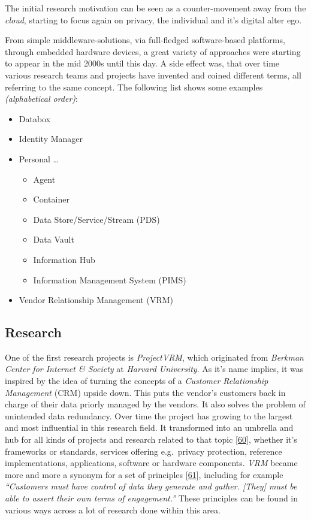 \documentclass[12pt,english,a4paper,titlepage,cleardoublepage=empty,dottedtoc]{report}
\providecommand{\tightlist}{%
  \setlength{\itemsep}{0pt}\setlength{\parskip}{0pt}}
\begin{document}
The initial research motivation can be seen as a counter-movement away
from the \emph{cloud}, starting to focus again on privacy, the
individual and it's digital alter ego.

From simple middleware-solutions, via full-fledged software-based
platforms, through embedded hardware devices, a great variety of
approaches were starting to appear in the mid 2000s until this day. A
side effect was, that over time various research teams and projects have
invented and coined different terms, all referring to the same concept.
The following list shows some examples \emph{(alphabetical order)}:

\begin{itemize}
\tightlist
\item
  Databox
\item
  Identity Manager
\item
  Personal \ldots{}

  \begin{itemize}
  \tightlist
  \item
    Agent
  \item
    Container
  \item
    Data Store/Service/Stream (PDS)
  \item
    Data Vault
  \item
    Information Hub
  \item
    Information Management System (PIMS)
  \end{itemize}
\item
  Vendor Relationship Management (VRM)
\end{itemize}

\subsection{Research}\label{research}

One of the first research projects is \emph{ProjectVRM}, which
originated from \emph{Berkman Center for Internet \& Society} at
\emph{Harvard University}. As it's name implies, it was inspired by the
idea of turning the concepts of a \emph{Customer Relationship
Management} (CRM) upside down. This puts the vendor's customers back in
charge of their data priorly managed by the vendors. It also solves the
problem of unintended data redundancy. Over time the project has growing
to the largest and most influential in this research field. It
transformed into an umbrella and hub for all kinds of projects and
research related to that topic
{[}\protect\hyperlink{ref-web_2016_projectvrm_development-work}{60}{]},
whether it's frameworks or standards, services offering e.g.~privacy
protection, reference implementations, applications, software or
hardware components. \emph{VRM} became more and more a synonym for a set
of principles
{[}\protect\hyperlink{ref-web_2016_projectvrm_principles}{61}{]},
including for example \emph{``Customers must have control of data they
generate and gather. {[}They{]} must be able to assert their own terms
of engagement.''} These principles can be found in various ways across a
lot of research done within this area.
\end{document}
